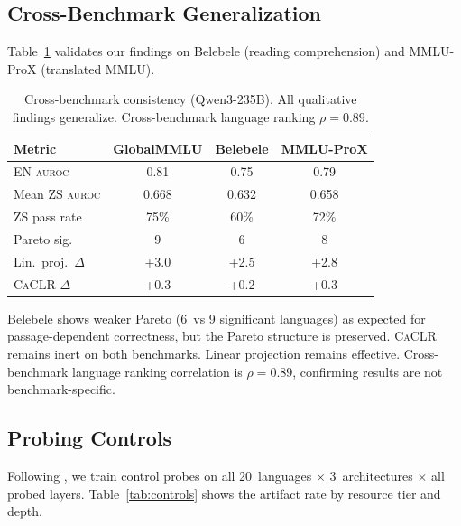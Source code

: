 \documentclass[11pt,a4paper]{article}
\newcommand{\aur}{\textsc{auroc}}
\newcommand{\caclr}{\textsc{CaCLR}}
\begin{document}
\subsection{Cross-Benchmark Generalization}
\label{sec:benchmarks}

Table~\ref{tab:cross_bench} validates our findings on Belebele (reading comprehension) and MMLU-ProX (translated MMLU).

\begin{table}[t]
\centering
\small
\begin{tabular}{lccc}
\toprule
\textbf{Metric} & \textbf{GlobalMMLU} & \textbf{Belebele} & \textbf{MMLU-ProX} \\
\midrule
EN \aur{} & 0.81 & 0.75 & 0.79 \\
Mean ZS \aur{} & 0.668 & 0.632 & 0.658 \\
ZS pass rate & 75\% & 60\% & 72\% \\
Pareto sig. & 9 & 6 & 8 \\
Lin.\ proj.\ $\Delta$ & +3.0 & +2.5 & +2.8 \\
\caclr{} $\Delta$ & +0.3 & +0.2 & +0.3 \\
\bottomrule
\end{tabular}
\caption{Cross-benchmark consistency (Qwen3-235B). All qualitative findings generalize. Cross-benchmark language ranking $\rho = 0.89$.}
\label{tab:cross_bench}
\end{table}

Belebele shows weaker Pareto (6~vs 9 significant languages) as expected for passage-dependent correctness, but the Pareto structure is preserved. \caclr{} remains inert on both benchmarks. Linear projection remains effective. Cross-benchmark language ranking correlation is $\rho = 0.89$, confirming results are not benchmark-specific.

\subsection{Probing Controls}
\label{sec:controls}

Following \citet{hewitt2019designing}, we train control probes on all 20~languages $\times$ 3~architectures $\times$ all probed layers. Table~\ref{tab:controls} shows the artifact rate by resource tier and depth.
\end{document}
